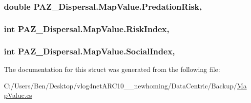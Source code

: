 \hypertarget{struct_p_a_z___dispersal_1_1_map_value_ad3188b72ccbeba00591221f39e6180bb}{
\subsubsection[{Predation\-Risk}]{\setlength{\rightskip}{0pt plus 5cm}double P\-A\-Z\-\_\-\-Dispersal.\-Map\-Value.\-Predation\-Risk\hspace{0.3cm}{\ttfamily [get]}, {\ttfamily [set]}}}\label{struct_p_a_z___dispersal_1_1_map_value_ad3188b72ccbeba00591221f39e6180bb}
\hypertarget{struct_p_a_z___dispersal_1_1_map_value_af9e3d1d7016aa35c8f6a2db210a3582a}{
\subsubsection[{Risk\-Index}]{\setlength{\rightskip}{0pt plus 5cm}int P\-A\-Z\-\_\-\-Dispersal.\-Map\-Value.\-Risk\-Index\hspace{0.3cm}{\ttfamily [get]}, {\ttfamily [set]}}}\label{struct_p_a_z___dispersal_1_1_map_value_af9e3d1d7016aa35c8f6a2db210a3582a}
\hypertarget{struct_p_a_z___dispersal_1_1_map_value_acea5eedbcfdefea5cf4f5f824f74e617}{
\subsubsection[{Social\-Index}]{\setlength{\rightskip}{0pt plus 5cm}int P\-A\-Z\-\_\-\-Dispersal.\-Map\-Value.\-Social\-Index\hspace{0.3cm}{\ttfamily [get]}, {\ttfamily [set]}}}\label{struct_p_a_z___dispersal_1_1_map_value_acea5eedbcfdefea5cf4f5f824f74e617}


The documentation for this struct was generated from the following file\-:\begin{DoxyCompactItemize}
\item 
C\-:/\-Users/\-Ben/\-Desktop/vlog4net\-A\-R\-C10\-\_\-\_\-newhoming/\-Data\-Centric/\-Backup/\hyperlink{_backup_2_map_value_8cs}{Map\-Value.\-cs}\end{DoxyCompactItemize}
